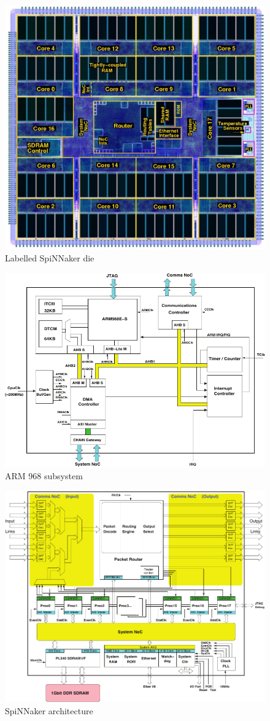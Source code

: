 \documentclass[oneside, a4paper, 11pt]{memoir}
\begin{document}
\begin{figure}[htbp]
	\centering
	\includegraphics[width=0.5\linewidth]{images/spin2_labelled.jpg}
	\caption{Labelled SpiNNaker die}
\end{figure}

\begin{figure}[htbp]
	\centering
	\includegraphics[width=0.8\linewidth]{images/arm968_subsystem.pdf}
	\caption{ARM 968 subsystem}
\end{figure}

\begin{figure}[htbp]
	\centering
	\includegraphics[width=0.8\linewidth]{images/spinnaker_architecture.pdf}
	\caption{SpiNNaker architecture}	
\end{figure}
\end{document}
